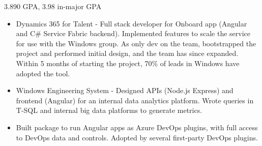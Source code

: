 \documentclass[10pt,a4paper]{altacv}
\begin{document}

\begin{fullwidth}
\makecvheader
\end{fullwidth}




3.890 GPA, 3.98 in-major GPA

\divider
{}



\begin{itemize}
\item Dynamics 365 for Talent - Full stack developer for Onboard app (Angular and C\# Service Fabric backend). Implemented features to scale the service for use with the Windows group. As only dev on the team, bootstrapped the project and performed initial design, and the team has since expanded. Within 5 months of starting the project, 70\% of leads in Windows have adopted the tool.
\item Windows Engineering System - Designed APIs (Node.js Express) and frontend (Angular) for an internal data analytics platform. Wrote queries in T-SQL and internal big data platforms to generate metrics.
\item Built package to run Angular apps as Azure DevOps plugins, with full access to DevOps data and controls. Adopted by several first-party DevOps plugins.
\end{itemize}
\end{document}
